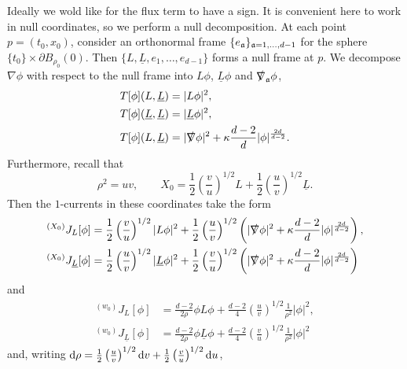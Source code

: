 Ideally we wold like for the flux term to have a sign. It is convenient here to work in null coordinates, so we perform a null decomposition. At each point $p = (t_0, x_0)$, consider an orthonormal frame $\{ e_\mathfrak a \}_{\mathfrak a = 1, \dots, d - 1}$ for the sphere $\{t_0\} \times \partial B_{\rho_0} (0)$. Then $\{L, \underline L, e_1, \dots, e_{d - 1}\}$ forms a null frame at $p$. We decompose $\nabla \phi$ with respect to the null frame into $L\phi$, $\underline L \phi$ and $\slashed \nabla_\mathfrak a \phi$,
	\begin{equation}
		\begin{split}
			T[\phi](L, \underline L)
				&= |L\phi|^2, \\
			T[\phi]	(\underline L, \underline L)
				&= |\underline L \phi|^2, \\
			T[\phi] (L, \underline L)
				&= |\slashed \nabla \phi|^2 + \kappa \frac{d - 2}{d} |\phi|^{\frac{2d}{d - 2}}.
		\end{split}
	\end{equation}
Furthermore, recall that 
	\[
		\rho^2 = uv, \qquad X_0 = \frac12 \left( \frac{v}{u} \right)^{1/2} L + \frac12 \left( \frac{u}{v} \right)^{1/2} \underline L. 
	\]
Then the $1$-currents in these coordinates take the form 
	\begin{equation}
	\begin{split}
		{^{(X_0)}} J_L [\phi]
			&= \frac12 \left( \frac{v}{u} \right)^{1/2}  |L \phi|^2 + \frac12 \left( \frac{u}{v}\right)^{1/2} \left( |\slashed \nabla \phi|^2 + \kappa \frac{d - 2}{d} |\phi|^{\frac{2d}{d - 2}}  \right),\\
		{^{(X_0)}} J_{\underline L} [\phi]
			&= \frac12 \left( \frac{u}{v} \right)^{1/2}  |\underline L \phi|^2 + \frac12 \left( \frac{v}{u}\right)^{1/2} \left( |\slashed \nabla \phi|^2 + \kappa \frac{d - 2}{d} |\phi|^{\frac{2d}{d - 2}}  \right)	
	\end{split}
	\end{equation}	
and
	\begin{equation}
	\begin{split}
		{^{(w_0)}} J_L [\phi]
			&= \frac{d - 2}{2\rho} \phi L\phi + \frac{d - 2}{4} \left( \frac{u}{v} \right)^{1/2} \frac1{\rho^2} |\phi|^2,\\ 
		{^{(w_0)}} J_{\underline L} [\phi]
			&= \frac{d - 2}{2\rho} \phi \underline L\phi + \frac{d - 2}{4} \left( \frac{v}{u} \right)^{1/2} \frac1{\rho^2} |\phi|^2	
	\end{split}
	\end{equation}		
and, writing $\mathrm{d} \rho = \tfrac12 \left(\tfrac{u}{v}\right)^{1/2} \mathrm{d} v + \tfrac12 \left( \tfrac{v}{u} \right)^{1/2} \mathrm{d} u$, 

